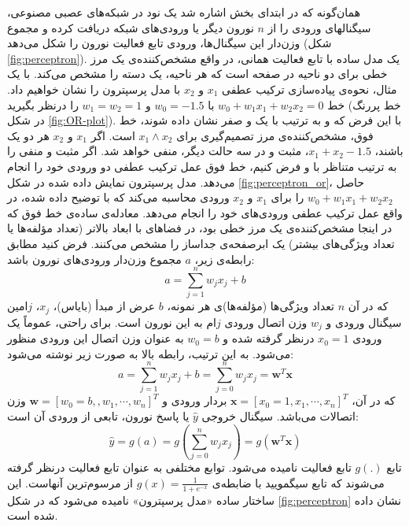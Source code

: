 \documentclass[11pt, twoside]{imsproc}
\let\LTRfootnote\footnoteA
\begin{document}
همان‌گونه که در ابتدای بخش اشاره شد یک نود در شبکه‌های عصبی مصنوعی، سیگنالهای ورودی را از $n$‌ نورون دیگر یا ورودی‌های شبکه دریافت کرده و مجموع وزن‌دار این سیگنال‌ها، ورودی تابع فعالیت
  نورون را شکل می‌دهد (شکل
\ref{fig:perceptron}).
  یک مدل ساده با تابع فعالیت همانی، در واقع مشخص‌کننده‌ی یک مرز خطی برای دو ناحیه در صفحه است که هر ناحیه، یک دسته را مشخص می‌کند. با یک مثال، نحوه‌ی پیاده‌سازی ترکیب عطفی
  $x_1$
  و
  $x_2$
با مدل پرسپترون را نشان خواهیم داد.
خط
$w_0+w_1x_1+w_2x_2=0$
با
$w_0=-1.5$
و
$w_1=w_2=1$
را درنظر بگیرید (خط پررنگ در شکل
 \ref{fig:OR-plot}).
  با این فرض که
و
به ترتیب با یک و صفر نشان داده شوند، خط فوق، مشخص‌کننده‌ی مرز تصمیم‌گیری برای
$x_1 \wedge x_2$
 است.
اگر
$x_1$
و
$x_2$
هر دو یک
  باشند،
$x_1+x_2-1.5$،
مثبت و در سه حالت دیگر، منفی خواهد شد. اگر مثبت و منفی را به ترتیب متناظر با
و
 فرض کنیم، خط فوق عمل ترکیب عطفی دو ورودی خود را انجام می‌دهد.
 مدل پرسپترون نمایش داده شده در شکل
 \ref{fig:perceptron_or}، 
 حاصل 
 $w_0+w_1x_1+w_2x_2$
 را برای 
 $x_1$
 و
 $x_2$
ورودی محاسبه می‌کند که با توضیح داده شده،‌ در واقع عمل ترکیب عطفی ورودی‌های خود را انجام می‌دهد. 
معادله‌ی ساده‌ی خط فوق که در اینجا مشخص‌کننده‌ی یک مرز خطی بود، در فضاهای با ابعاد بالاتر (تعداد مؤلفه‌ها یا تعداد ویژگی‌های بیشتر) یک ابرصفحه‌ی جداساز را مشخص می‌کنند.
    فرض کنید مطابق رابطه‌ی زیر،
    $a$
     مجموع وزن‌دار ورودی‌های نورون باشد:
  \begin{equation}
  \label{eq:noronIn}
  a=\sum_{j=1}^n w_j x_j+b
\end{equation}
که در آن
$n$
تعداد ویژگی‌ها (مؤلفه‌ها)ی هر نمونه،
    $b$
عرض از مبدأ (بایاس)،
 $x_j$،
$j$امین
سیگنال ورودی و
$w_j$
وزن اتصال ورودی $j$ام به این نورون است.
برای راحتی، عموماً یک ورودی
 $x_0=1$
 درنظر گرفته شده و
$w_0=b$
به عنوان وزن اتصال این ورودی منظور می‌شود. به این ترتیب، رابطه بالا به صورت زیر نوشته می‌شود:
\begin{equation}
  a=\sum_{j=1}^n w_j x_j+b=\sum_{j=0}^n w_j x_j=\mathbf{w}^T{\mathbf{x}}
\end{equation}
که در آن، 
    ${\mathbf{x}}=[x_0=1,x_1,\cdots,x_n]^T$
بردار ورودی و
      $\mathbf{w}=[w_0=b,,w_1,\cdots,w_n]^T$
وزن اتصالات می‌باشد.
سیگنال خروجی
$\hat{y}$
یا پاسخ نورون،‌ تابعی از ورودی آن است:
\begin{equation} 	
  \hat{y}=g(a)=g\left(\sum_{j=0}^n w_j x_j\right)=g(\mathbf{w}^T{\mathbf{x}})
\end{equation}
تابع $g(.)$ تابع فعالیت نامیده می‌شود. توابع مختلفی به عنوان تابع فعالیت درنظر گرفته می‌شوند که تابع سیگمویید با ضابطه‌ی
$g(x)=\frac{1}{1+e^{-x}}$
از مرسوم‌ترین آنهاست.
این ساختار ساده «مدل پرسپترون» نامیده می‌شود که در
شکل
\ref{fig:perceptron}
نشان داده شده است.
\end{document}
